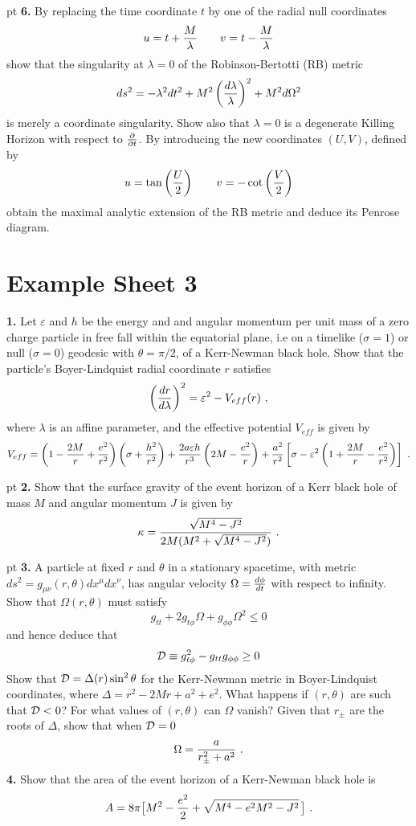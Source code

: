  pt 
\noindent 
{\bf 6.} By replacing the time coordinate $t$
by one of the radial null coordinates
$$
u= t+ {M\over \lambda} \qquad v= t- {M\over \lambda}
$$
show that the singularity at $\lambda=0$ of the Robinson-Bertotti (RB)
metric
$$
ds^2 = -\lambda^2 dt^2 + M^2 \left({d\lambda\over \lambda}\right)^2 +
M^2 d\Omega^2 
$$
is merely a coordinate singularity.
Show also that $\lambda=0$ is a degenerate Killing Horizon with respect
to $\partial\over \partial t$. By
introducing the new coordinates $(U,V)$, defined by
$$
u= \tan \left({U\over 2}\right)\qquad v=-\cot \left({V\over2}\right)
$$
obtain the maximal analytic extension of the RB metric and deduce its
Penrose diagram.

\vfill\eject

\section{Example Sheet 3}

\noindent 
{\bf 1.} Let $\varepsilon$ and $h$ be the energy and and angular
momentum per unit mass of a zero charge particle in free fall
within the equatorial plane, i.e on a timelike ($\sigma=1$) or null
($\sigma=0$) geodesic with $\theta=\pi/2$, of a Kerr-Newman black hole.
Show that the particle's Boyer-Lindquist radial coordinate $r$
satisfies   
$$ 
\left({dr\over d\lambda}\right)^2 =\varepsilon^2 - V_{eff}(r)\ ,
$$ 
where $\lambda$ is an affine parameter, and the effective potential
$V_{eff}$ is given by $$ 
V_{eff} =
\left(1-{2M\over r}+{e^2\over r^2}\right)\left(\sigma + {h^2\over
r^2}\right) + {2a\varepsilon h\over r^3}\left( 2M -{e^2\over r}\right)
+{a^2\over r^2}\left[\sigma-\varepsilon^2\left(1+{2M\over r}-{e^2\over
r^2}\right)\right] \ .
$$

 pt 
\noindent 
{\bf 2.} Show that the surface gravity of the event horizon of a Kerr
black hole of mass $M$ and angular momentum $J$ is given by
$$
\kappa = {\sqrt{M^4 -J^2}\over 2M( M^2 + \sqrt{M^4 -J^2})}\ .
$$

 pt 
\noindent 
{\bf 3.} A particle at fixed $r$ and $\theta$ in a stationary
spacetime, with metric $ds^2= g_{\mu\nu}(r,\theta)dx^\mu dx^\nu$, has
angular velocity $\Omega= {d\phi\over dt}$ with respect to infinity.
Show that $\Omega(r,\theta)$ must satisfy
$$
g_{tt} + 2g_{t\phi}\Omega + g_{\phi\phi}\Omega^2 \le 0
$$
and hence deduce that
$$
{\cal D}\equiv g_{t\phi}^2 - g_{tt}g_{\phi\phi} \ge 0
$$
Show that ${\cal D}=\Delta (r) \sin^2\theta$ for the Kerr-Newman 
metric in Boyer-Lindquist coordinates, where $\Delta= r^2-2Mr+a^2+e^2$.
What happens if $(r,\theta)$ are such that ${\cal D}<0$? For what
values of $(r,\theta)$ can $\Omega$ vanish? Given that $r_{\pm}$ are the 
roots of $\Delta$, show that when ${\cal D}=0$  
$$ 
\Omega = {a\over r_{\pm}^2 +a^2} \ .
$$
\vskip 10pt
\noindent
{\bf 4.} Show that the area of the event horizon of a Kerr-Newman
black hole is
$$
A= 8\pi\big[ M^2 - {e^2\over2} + \sqrt{ M^4 -e^2 M^2 -J^2 }\,\big]\ .
$$

